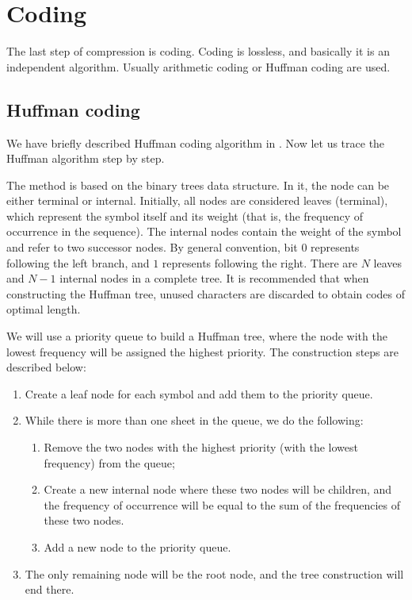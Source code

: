 \section{Coding}

The last step of compression is coding. Coding is lossless, and basically it is an independent algorithm. Usually arithmetic coding or Huffman coding are used.

\subsection{Huffman coding}

We have briefly described Huffman coding algorithm in . Now let us trace the Huffman algorithm step by step.

The method is based on the binary trees data structure. In it, the node can be either terminal or internal. Initially, all nodes are considered leaves (terminal), which represent the symbol itself and its weight (that is, the frequency of occurrence in the sequence). The internal nodes contain the weight of the symbol and refer to two successor nodes. By general convention, bit $0$ represents following the left branch, and $1$ represents following the right. There are $N$ leaves and $N-1$ internal nodes in a complete tree. It is recommended that when constructing the Huffman tree, unused characters are discarded to obtain codes of optimal length.

We will use a priority queue to build a Huffman tree, where the node with the lowest frequency will be assigned the highest priority. The construction steps are described below:

\begin{enumerate}
    \item Create a leaf node for each symbol and add them to the priority queue.
    \item While there is more than one sheet in the queue, we do the following:
          \begin{enumerate}
              \item Remove the two nodes with the highest priority (with the lowest frequency) from the queue;
              \item Create a new internal node where these two nodes will be children, and the frequency of occurrence will be equal to the sum of the frequencies of these two nodes.
              \item Add a new node to the priority queue.
          \end{enumerate}
    \item The only remaining node will be the root node, and the tree construction will end there.
\end{enumerate}

